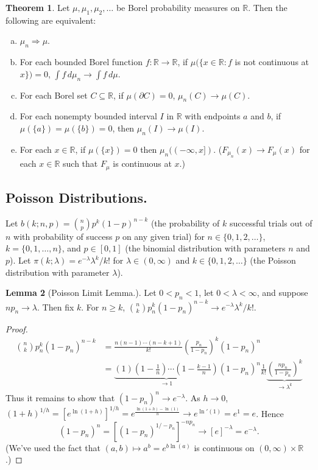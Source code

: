 \documentclass{article}
\newcommand{\R}{\mathbb{R}}
\theoremstyle{definition}
\newtheorem{theorem}{Theorem}
\newtheorem{lemma}[theorem]{Lemma}
\begin{document}
\begin{theorem}
Let $\mu, \mu_1, \mu_2, \dots$ be Borel probability measures on $\R$. Then the following are equivalent:
\begin{enumerate}[(a)]
    \item $\mu_n \Rightarrow \mu$.
    \item For each bounded Borel function $f : \R \to \R$, if $\mu(\{x \in \R : f$ is not continuous at $x\}) = 0$, $\int f \,d\mu_n \to \int f \,d\mu$.
    \item For each Borel set $C \subseteq \R$, if $\mu(\partial C) = 0$, $\mu_n(C) \to \mu(C)$.
    \item For each nonempty bounded interval $I$ in $\R$ with endpoints $a$ and $b$, if $\mu(\{a\}) = \mu(\{b\}) = 0$, then $\mu_n(I) \to \mu(I)$.
    \item For each $x \in \R$, if $\mu(\{x\}) = 0$ then $\mu_n((-\infty, x])$. ($F_{\mu_n}(x) \to F_\mu(x)$ for each $x \in \R$ such that $F_\mu$ is continuous at $x$.)
\end{enumerate}
\end{theorem}

\subsection*{Poisson Distributions.} Let $b(k; n, p) = \binom{n}{p}p^k(1-p)^{n-k}$ (the probability of $k$ successful trials out of $n$ with probability of success $p$ on any given trial) for $n \in \{0, 1, 2, \dots\}$, $k = \{0, 1, \dots, n\}$, and $p \in [0,1]$ (the binomial distribution with parameters $n$ and $p$). Let $\pi(k;\lambda) = e^{-\lambda} \lambda^k/k!$ for $\lambda \in (0, \infty)$ and $k \in \{0, 1, 2, \dots\}$ (the Poisson distribution with parameter $\lambda$).

\begin{lemma}[Poisson Limit Lemma.]
    Let $0 < p_n < 1$, let $0 < \lambda < \infty$, and suppose $np_n \to \lambda$. Then fix $k$. For $n \geq k$, $\binom{n}{k}p_n^k(1-p_n)^{n-k} \to e^{-\lambda}\lambda^k/k!$.
\end{lemma}
\begin{proof}
\begin{align*}
    \binom{n}{k}p_n^k(1-p_n)^{n-k} &= \frac{n(n-1)\cdots(n-k+1)}{k!}\left(\frac{p_n}{1-p_n}\right)^k(1-p_n)^n \\
    &= \underbrace{(1)\left(1-\frac{1}{n}\right) \cdots \left(1 - \frac{k-1}{n}\right)}_{\to 1} (1-p_n)^n\frac{1}{k!}\underbrace{\left(\frac{np_n}{1-p_n}\right)^k}_{\to \lambda^k}
\end{align*}
Thus it remains to show that $(1-p_n)^n \to e^{-\lambda}$. As $h \to 0$, $(1+h)^{1/h} = [e^{\ln(1+h)}]^{1/h} = e^{\frac{\ln(1+h)-\ln(1)}{h}} \to e^{\ln'(1)} = e^1 = e$.
Hence
\[
    (1-p_n)^n = \left[(1-p_n)^{1/-p_n}\right]^{-np_n} \to [e]^{-\lambda} = e^{-\lambda}.
\]
(We've used the fact that $(a, b) \mapsto a^b = e^{b\ln(a)}$ is continuous on $(0, \infty) \times \R$.)
\end{proof}
\end{document}
